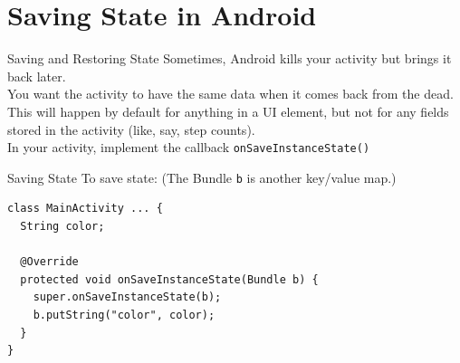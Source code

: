 \documentclass[aspectratio=169]{beamer}
\begin{document}
\section*{Saving State in Android}



\begin{frame}{Saving and Restoring State}
\large
Sometimes, Android kills your activity but brings it back later. \\
\vspace{2em}
You want the activity to have the same data when it comes back from the
dead. \\
\vspace{2em}
This will happen by default for anything in a UI element, but
not for any fields stored in the activity (like, say, step counts). \\
\vspace{2em}
In your activity, implement the callback {\tt onSaveInstanceState()}
\end{frame}



\begin{frame}[fragile]{Saving State}
\vspace{1em}
\Large
To save state: (The Bundle {\tt b} is another key/value map.)
\vspace{1em}
{\normalsize
\begin{verbatim}
class MainActivity ... {
  String color;

  @Override
  protected void onSaveInstanceState(Bundle b) {
    super.onSaveInstanceState(b);
    b.putString("color", color);
  }
}
\end{verbatim}
}
\end{frame}
\end{document}
